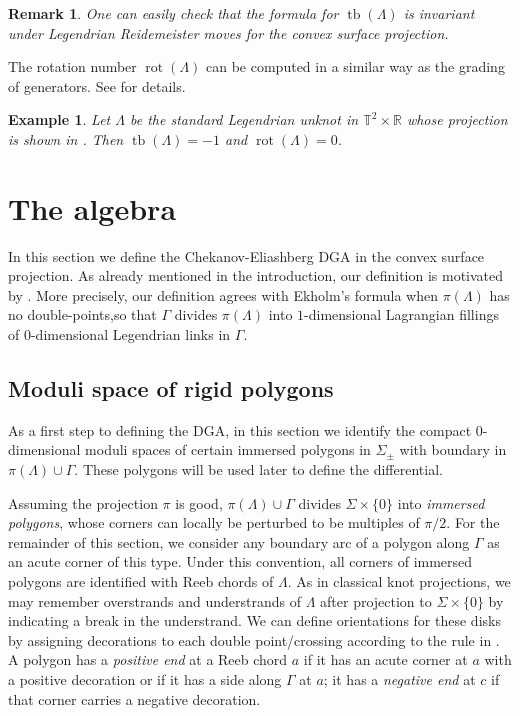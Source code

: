 \documentclass[11pt]{amsart}
\theoremstyle{mystyle}
\newtheorem{example}[example]{Example}
\newtheorem{remark}[remark]{Remark}
\newcommand{\R}{\mathbb{R}}
\newcommand{\<}{\langle}
\renewcommand{\>}{\rangle}
\DeclareMathOperator{\rot}{\text{rot}}
\DeclareMathOperator{\tb}{tb}
\begin{document}
\begin{remark}
    One can easily check that the formula for $\tb(\Lambda)$ is invariant under Legendrian Reidemeister moves for the convex surface projection.
\end{remark}

The rotation number $\rot(\Lambda)$ can be computed in a similar way as the grading of generators. See  for details.

\begin{example}
    Let $\Lambda$ be the standard Legendrian unknot in $\mathbb{T}^2 \times \R$ whose projection is shown in . Then $\tb(\Lambda) = -1$ and $\rot(\Lambda) = 0$.
\end{example}

\section{The algebra}\label{sec:algebra}

In this section we define the Chekanov-Eliashberg DGA in the convex surface projection. As already mentioned in the introduction, our definition is motivated by \cite[Lemma 2.3]{ekholm2016nonloose}. More precisely, our definition agrees with Ekholm's formula when $\pi(\Lambda)$ has no double-points,so that $\Gamma$ divides $\pi(\Lambda)$ into $1$-dimensional Lagrangian fillings of $0$-dimensional Legendrian links in $\Gamma$.

\subsection{Moduli space of rigid polygons} \text{ }

As a first step to defining the DGA, in this section we identify the compact $0$-dimensional moduli spaces of certain immersed polygons in $\Sigma_\pm$ with boundary in $\pi(\Lambda) \cup \Gamma$. These polygons will be used later to define the differential.

Assuming the projection $\pi$ is good, $\pi(\Lambda)\cup \Gamma$ divides $\Sigma\times \{0\}$ into \textit{immersed polygons}, whose corners can locally be perturbed to be multiples of $\pi/2$. For the remainder of this section, we consider any boundary arc of a polygon along $\Gamma$ as an acute corner of this type. Under this convention, all corners of immersed polygons are identified with Reeb chords of $\Lambda$. As in classical knot projections, we may remember overstrands and understrands of $\Lambda$ after projection to $\Sigma\times \{0\}$ by indicating a break in the understrand. We can define orientations for these disks by assigning decorations to each double point/crossing according to the rule in . A polygon has a \textit{positive end} at a Reeb chord $a$ if it has an acute corner at $a$ with a positive decoration or if it has a side along $\Gamma$ at $a$; it has a \textit{negative end} at $c$ if that corner carries a negative decoration.
\end{document}
